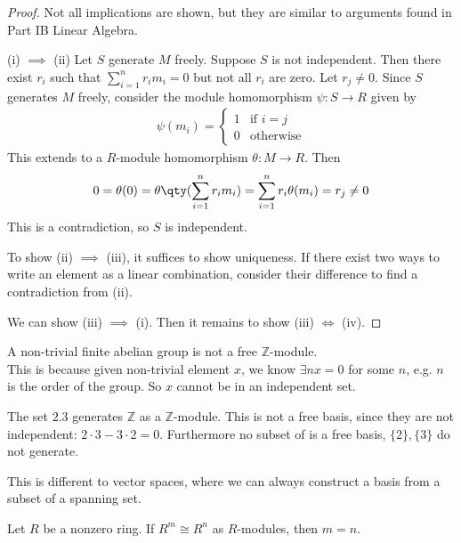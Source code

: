 \begin{proof}
	Not all implications are shown, but they are similar to arguments found in Part IB Linear Algebra.

	(i) $\implies$ (ii)
	Let $S$ generate $M$ freely.
	Suppose $S$ is not independent.
	Then there exist $r_i$ such that $\sum_{i=1}^n r_i m_i = 0$ but not all $r_i$ are zero.
	Let $r_j \neq 0$.
	Since $S$ generates $M$ freely, consider the module homomorphism $\psi : S \to R$ given by
	\begin{align*}
		\psi(m_i) = \begin{cases}
			1 & \text{if } i = j \\
			0 & \text{otherwise}
		\end{cases}
	\end{align*}
	This extends to a $R$-module homomorphism $\theta : M \to R$.
	Then
	\begin{align*}
		0 = \theta(0) = \theta\qty(\sum_{i=1}^n r_i m_i) = \sum_{i=1}^n r_i \theta(m_i) = r_j \neq 0
	\end{align*}
	This is a contradiction, so $S$ is independent.

	To show (ii) $\implies$ (iii), it suffices to show uniqueness.
	If there exist two ways to write an element as a linear combination, consider their difference to find a contradiction from (ii).

	We can show (iii) $\implies$ (i).
	Then it remains to show (iii) $\iff$ (iv).
\end{proof}

\begin{example}
	A non-trivial finite abelian group is not a free $\mathbb Z$-module. \\
	This is because given non-trivial element $x$, we know $\exists nx = 0$ for some $n$, e.g. $n$ is the order of the group.
	So $x$ cannot be in an independent set.
\end{example}

\begin{example}
	The set $\qty{2,3}$ generates $\mathbb Z$ as a $\mathbb Z$-module.
	This is not a free basis, since they are not independent: $2 \cdot 3 - 3 \cdot 2 = 0$.
	Furthermore no subset of is a free basis, $\{2\}, \{3\}$ do not generate.

	This is different to vector spaces, where we can always construct a basis from a subset of a spanning set.
\end{example} 

\begin{proposition} \label{prp:15.3}
	Let $R$ be a nonzero ring.
	If $R^m \cong R^n$ as $R$-modules, then $m = n$.
\end{proposition}

